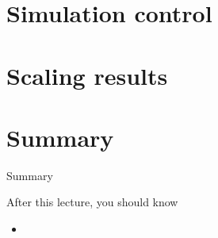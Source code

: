 \documentclass[12pt,t]{beamer}
\begin{document}
\section{Simulation control}




\section{Scaling results}



\section{Summary}
\begin{frame}{Summary}
\begin{block}{After this lecture, you should know}
\begin{itemize}
\item 
\end{itemize}
\end{block}
\end{frame}
\end{document}
